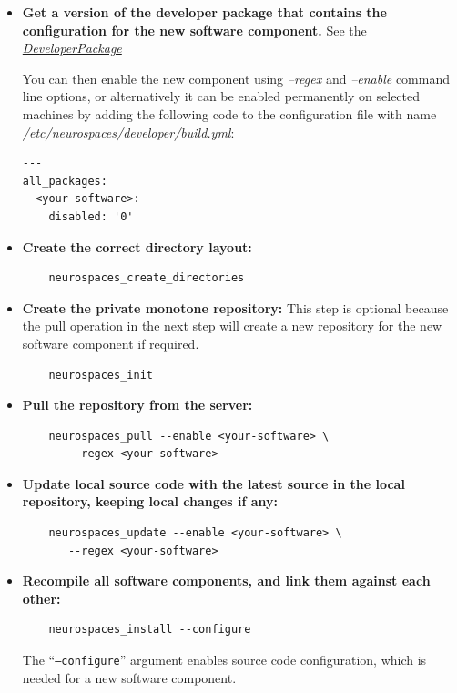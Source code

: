 \documentclass[12pt]{article}
\begin{document}
\begin{itemize}

\item {\bf Get a version of the developer package that contains the
    configuration for the new software component.}  See
  the~\href{../developer-package/developer-package.tex}{\it
    DeveloperPackage}

  You can then enable the new component using {\it --regex} and {\it
    --enable} command line options, or alternatively it can be enabled
  permanently on selected machines by adding the following code to the
  configuration file with name {\it
    /etc/neurospaces/developer/build.yml}:

\begin{verbatim}
---
all_packages:
  <your-software>:
    disabled: '0'
\end{verbatim}


\item {\bf Create the correct directory layout:}
\begin{verbatim}
	neurospaces_create_directories
\end{verbatim}

\item {\bf Create the private monotone repository:} This step is
  optional because the pull operation in the next step will create a
  new repository for the new software component if required.
\begin{verbatim}
	neurospaces_init
\end{verbatim}

\item {\bf Pull the repository from the server:}
\begin{verbatim}
	neurospaces_pull --enable <your-software> \
	   --regex <your-software>
\end{verbatim}
  
\item {\bf Update local source code with the latest source in the
    local repository, keeping local changes if any:}
\begin{verbatim}
	neurospaces_update --enable <your-software> \
	   --regex <your-software>
\end{verbatim}
  
\item {\bf Recompile all software components, and link them against
    each other:}
\begin{verbatim}
	neurospaces_install --configure
\end{verbatim}
  The ``{\tt --configure}'' argument enables source code
  configuration, which is needed for a new software component.
\end{itemize}
\end{document}
